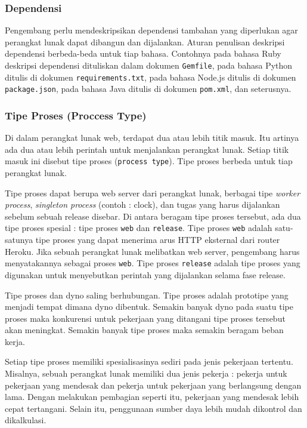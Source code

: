 \subsubsection{Dependensi}
Pengembang perlu mendeskripsikan dependensi tambahan yang diperlukan agar perangkat lunak dapat dibangun dan dijalankan. Aturan penulisan deskripsi dependensi berbeda-beda untuk tiap bahasa. Contohnya pada bahasa Ruby deskripsi dependensi dituliskan dalam dokumen \texttt{Gemfile}, pada bahasa Python ditulis di dokumen \texttt{requirements.txt}, pada bahasa Node.js ditulis di dokumen \texttt{package.json}, pada bahasa Java ditulis di dokumen \texttt{pom.xml}, dan seterusnya.

\subsubsection{Tipe Proses (Proccess Type)}
Di dalam perangkat lunak web, terdapat dua atau lebih titik masuk. Itu artinya ada dua atau lebih perintah untuk menjalankan perangkat lunak. Setiap titik masuk ini disebut tipe proses (\texttt{process type}). Tipe proses berbeda untuk tiap perangkat lunak.

Tipe proses dapat berupa web server dari perangkat lunak, berbagai tipe \textit{worker process}, \textit{singleton process} (contoh : clock), dan tugas yang harus dijalankan sebelum sebuah release disebar. Di antara beragam tipe proses tersebut, ada dua tipe proses spesial : tipe proses \texttt{web} dan \texttt{release}. Tipe proses \texttt{web} adalah satu-satunya tipe proses yang dapat menerima arus HTTP eksternal dari router Heroku. Jika sebuah perangkat lunak melibatkan web server, pengembang harus menyatakannya sebagai proses \texttt{web}. Tipe proses \texttt{release} adalah tipe proses yang digunakan untuk menyebutkan perintah yang dijalankan selama fase release.

Tipe proses dan dyno saling berhubungan. Tipe proses adalah prototipe yang menjadi tempat dimana dyno dibentuk. Semakin banyak dyno pada suatu tipe proses maka konkurensi untuk pekerjaan yang ditangani tipe proses tersebut akan meningkat. Semakin banyak tipe proses maka semakin beragam beban kerja.

Setiap tipe proses memiliki spesialisasinya sediri pada jenis pekerjaan tertentu. Misalnya, sebuah perangkat lunak memiliki dua jenis pekerja : pekerja untuk pekerjaan yang mendesak dan pekerja untuk pekerjaan yang berlangsung dengan lama. Dengan melakukan pembagian seperti itu, pekerjaan yang mendesak lebih cepat tertangani. Selain itu, penggunaan sumber daya lebih mudah dikontrol dan dikalkulasi.

